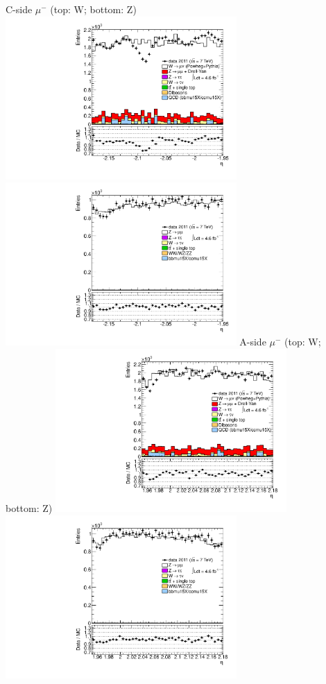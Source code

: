  {
\colb[T]
C-side $\mu^{-}$ (top: W; bottom: Z)
\centering
\includegraphics[width=0.66\textwidth]{dates/20130306/figures/both/WlQ2_10_C_stack_l_eta_NEG} \\
\includegraphics[width=0.66\textwidth]{dates/20130306/figures/both/Z_10_C_stack_lN_eta_ALL.pdf}
A-side $\mu^{-}$ (top: W; bottom: Z)
\centering
\includegraphics[width=0.66\textwidth]{dates/20130306/figures/both/WlQ2_10_A_stack_l_eta_NEG} \\
\includegraphics[width=0.66\textwidth]{dates/20130306/figures/both/Z_10_A_stack_lN_eta_ALL.pdf} 
\cole
} %
